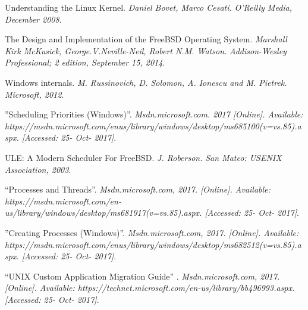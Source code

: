 \documentclass[10pt,draftclsnofoot,peerreview,letterpaper,onecolumn,]{IEEEtran}
\begin{document}
\begin{thebibliography}{1}

 Understanding the Linux Kernel.
\textit{Daniel Bovet, Marco Cesati.}
\textit{O'Reilly Media, December 2008}.

 The Design and Implementation of the FreeBSD Operating System.
\textit{Marshall Kirk McKusick, George.V.Neville-Neil, Robert N.M. Watson.}
\textit{Addison-Wesley Professional; 2 edition, September 15, 2014}.

 Windows internals.
\textit{M. Russinovich, D. Solomon, A. Ionescu and M. Pietrek.}
\textit{Microsoft, 2012}.

 ”Scheduling Priorities (Windows)”.
\textit{Msdn.microsoft.com. 2017 [Online]. Available:
https://msdn.microsoft.com/enus/library/windows/desktop/ms685100(v=vs.85).aspx. [Accessed: 25- Oct- 2017]}.


 ULE: A Modern Scheduler For FreeBSD.
\textit{J. Roberson.}
\textit{San Mateo: USENIX Association, 2003}.

 “Processes and Threads”.
\textit{Msdn.microsoft.com, 2017. [Online]. Available:
https://msdn.microsoft.com/en-us/library/windows/desktop/ms681917(v=vs.85).aspx. [Accessed: 25- Oct- 2017]}.

 ”Creating Processes (Windows)”.
\textit{Msdn.microsoft.com, 2017. [Online]. Available:
https://msdn.microsoft.com/enus/library/windows/desktop/ms682512(v=vs.85).aspx. [Accessed: 25- Oct- 2017]}.

 “UNIX Custom Application Migration Guide” .
\textit{Msdn.microsoft.com, 2017. [Online]. Available:
https://technet.microsoft.com/en-us/library/bb496993.aspx. [Accessed: 25- Oct- 2017]}.


\end{thebibliography}
\end{document}
